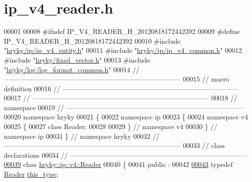 \hypertarget{ip__v4__reader_8h_source}{\section{ip\-\_\-v4\-\_\-reader.\-h}
}

\begin{DoxyCode}
00001 
00008 \textcolor{preprocessor}{#ifndef IP\_V4\_READER\_H\_20120818172442392}
00009 \textcolor{preprocessor}{}\textcolor{preprocessor}{#define IP\_V4\_READER\_H\_20120818172442392}
00010 \textcolor{preprocessor}{}\textcolor{preprocessor}{#include "\hyperlink{ip__v4__entity_8h}{hryky/ip/ip_v4_entity.h}"}
00011 \textcolor{preprocessor}{#include "\hyperlink{ip__v4__common_8h}{hryky/ip/ip_v4_common.h}"}
00012 \textcolor{preprocessor}{#include "\hyperlink{fixed__vector_8h}{hryky/fixed_vector.h}"}
00013 \textcolor{preprocessor}{#include "\hyperlink{log__format__common_8h}{hryky/log/log_format_common.h}"}
00014 \textcolor{comment}{//
      ------------------------------------------------------------------------------}
00015 \textcolor{comment}{// macro definition}
00016 \textcolor{comment}{//
      ------------------------------------------------------------------------------}
00017 \textcolor{comment}{//
      ------------------------------------------------------------------------------}
00018 \textcolor{comment}{// namespace}
00019 \textcolor{comment}{//
      ------------------------------------------------------------------------------}
00020 \textcolor{keyword}{namespace }hryky
00021 \{
00022 \textcolor{keyword}{namespace }ip
00023 \{
00024 \textcolor{keyword}{namespace }v4
00025 \{
00027     \textcolor{keyword}{class }Reader;
00028 
00029 \} \textcolor{comment}{// namespace v4}
00030 \} \textcolor{comment}{// namespace ip}
00031 \} \textcolor{comment}{// namespace hryky}
00032 \textcolor{comment}{//
      ------------------------------------------------------------------------------}
00033 \textcolor{comment}{// class declarations}
00034 \textcolor{comment}{//
      ------------------------------------------------------------------------------}
\hypertarget{ip__v4__reader_8h_source_l00039}{}\hyperlink{classhryky_1_1ip_1_1v4_1_1_reader}{00039} \textcolor{comment}{}\textcolor{keyword}{class }\hyperlink{classhryky_1_1ip_1_1v4_1_1_reader}{hryky::ip::v4::Reader}
00040 \{
00041 \textcolor{keyword}{public} :
00042 
\hypertarget{ip__v4__reader_8h_source_l00043}{}\hyperlink{classhryky_1_1ip_1_1v4_1_1_reader_a007590474d740ed246e201fe227b618f}{00043}     \textcolor{keyword}{typedef} \hyperlink{classhryky_1_1ip_1_1v4_1_1_reader}{Reader} \hyperlink{classhryky_1_1ip_1_1v4_1_1_reader_a007590474d740ed246e201fe227b618f}{this_type};

\end{DoxyCode}
